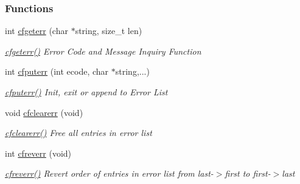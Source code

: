 \subsubsection*{Functions}
\begin{DoxyCompactItemize}
\item 
int \hyperlink{group__errors_ga2dc49b60b3ec7a82086e60f4b1c41e18}{cfgeterr} (char $\ast$string, size\-\_\-t len)
\begin{DoxyCompactList}\small\item\em \hyperlink{group__errors_ga2dc49b60b3ec7a82086e60f4b1c41e18}{cfgeterr()} Error Code and Message Inquiry Function \end{DoxyCompactList}\item 
int \hyperlink{group__errors_gaad2687826308f21b54657d2728e4cfcc}{cfputerr} (int ecode, char $\ast$string,...)
\begin{DoxyCompactList}\small\item\em \hyperlink{group__errors_gaad2687826308f21b54657d2728e4cfcc}{cfputerr()} Init, exit or append to Error List \end{DoxyCompactList}\item 
void \hyperlink{group__errors_gaad0c79adfdf363a11532dc4039136ec6}{cfclearerr} (void)
\begin{DoxyCompactList}\small\item\em \hyperlink{group__errors_gaad0c79adfdf363a11532dc4039136ec6}{cfclearerr()} Free all entries in error list \end{DoxyCompactList}\item 
int \hyperlink{group__errors_gabc3a143038fbcabc944d224e20ca50f8}{cfreverr} (void)
\begin{DoxyCompactList}\small\item\em \hyperlink{group__errors_gabc3a143038fbcabc944d224e20ca50f8}{cfreverr()} Revert order of entries in error list from last-\/$>$first to first-\/$>$last \end{DoxyCompactList}\end{DoxyCompactItemize}
